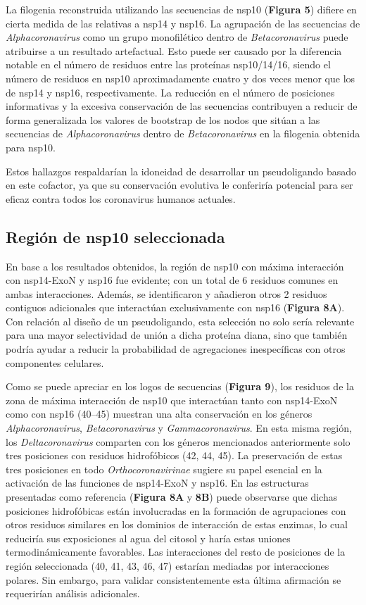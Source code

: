 La filogenia reconstruida utilizando las secuencias de nsp10 
(\textbf{Figura 5}) difiere en cierta medida de las relativas a nsp14 y 
nsp16. La agrupación de las secuencias de \textit{Alphacoronavirus} como un 
grupo monofilético dentro de \textit{Betacoronavirus} puede atribuirse a un 
resultado artefactual. Esto puede ser causado por la diferencia notable
en el número de residuos entre las proteínas nsp10/14/16, siendo el número 
de residuos en nsp10 aproximadamente cuatro y dos veces menor que los de 
nsp14 y nsp16, respectivamente. La reducción en el número de posiciones 
informativas y la excesiva conservación de las secuencias contribuyen a 
reducir de forma generalizada los valores de bootstrap de los nodos que 
sitúan a las secuencias de \textit{Alphacoronavirus} dentro de 
\textit{Betacoronavirus} en la filogenia obtenida para nsp10.

Estos hallazgos respaldarían la idoneidad de desarrollar un pseudoligando 
basado en este cofactor, ya que su conservación evolutiva le conferiría 
potencial para ser eficaz contra todos los coronavirus humanos actuales.

\subsection{Región de nsp10 seleccionada}

En base a los resultados obtenidos, la región de nsp10 con máxima 
interacción con nsp14-ExoN y nsp16 fue evidente; con un total de 6 residuos 
comunes en ambas interacciones. Además, se identificaron y añadieron otros 2
residuos contiguos adicionales que interactúan exclusivamente con nsp16 
(\textbf{Figura 8A}). Con relación al diseño de un pseudoligando, esta 
selección no solo sería relevante para una mayor selectividad de unión a 
dicha proteína diana, sino que también podría ayudar a reducir la 
probabilidad de agregaciones inespecíficas con otros componentes celulares.

Como se puede apreciar en los logos de secuencias (\textbf{Figura 9}), los 
residuos de la zona de máxima interacción de nsp10 que interactúan tanto con
nsp14-ExoN como con nsp16 (40--45) muestran una alta conservación en los 
géneros \textit{Alphacoronavirus}, \textit{Betacoronavirus} y 
\textit{Gammacoronavirus}. En esta misma región, los 
\textit{Deltacoronavirus} comparten con los géneros mencionados 
anteriormente solo tres posiciones con residuos hidrofóbicos (42, 44, 45). 
La preservación de estas tres posiciones en todo \textit{Orthocoronavirinae}
sugiere su papel esencial en la activación de las funciones de nsp14-ExoN y 
nsp16. En las estructuras presentadas como referencia (\textbf{Figura 8A} y
\textbf{8B}) puede observarse que dichas posiciones hidrofóbicas están 
involucradas en la formación de agrupaciones con otros residuos similares en
los dominios de interacción de estas enzimas, lo cual reduciría sus 
exposiciones al agua del citosol y haría estas uniones termodinámicamente 
favorables. Las interacciones del resto de posiciones de la región 
seleccionada (40, 41, 43, 46, 47) estarían mediadas por interacciones
polares. Sin embargo, para validar consistentemente esta última afirmación 
se requerirían análisis adicionales.

